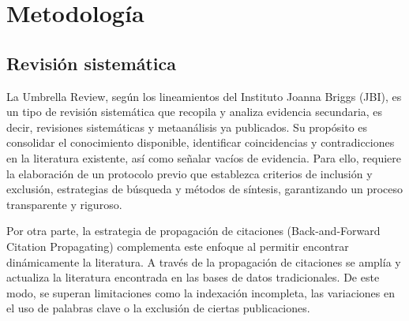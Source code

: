 \chapter{Metodología}
\section{Revisión sistemática}
La Umbrella Review, según los lineamientos del Instituto Joanna Briggs (JBI), es un tipo de revisión sistemática que recopila y analiza evidencia secundaria, 
es decir, revisiones sistemáticas y metaanálisis ya publicados.
Su propósito es consolidar el conocimiento disponible, identificar coincidencias y contradicciones en la literatura existente, así como señalar vacíos de evidencia.
Para ello, requiere la elaboración de un protocolo previo que establezca criterios de inclusión y exclusión, estrategias de búsqueda y métodos de síntesis, garantizando 
un proceso transparente y riguroso.

Por otra parte, la estrategia de propagación de citaciones (Back-and-Forward Citation Propagating) complementa este enfoque al permitir encontrar dinámicamente la literatura. 
A través de la propagación de citaciones se amplía y actualiza la literatura encontrada en las bases de datos tradicionales. De este modo, se superan limitaciones como la 
indexación incompleta, las variaciones en el uso de palabras clave o la exclusión de ciertas publicaciones.


